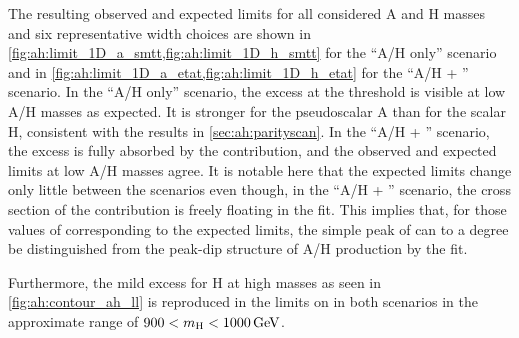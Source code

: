 The resulting observed and expected limits for all considered A and H masses and six representative width choices are shown in \cref{fig:ah:limit_1D_a_smtt,fig:ah:limit_1D_h_smtt} for the ``A/H only'' scenario and in \cref{fig:ah:limit_1D_a_etat,fig:ah:limit_1D_h_etat} for the ``A/H + \etat'' scenario. In the ``A/H only'' scenario, the excess at the \ttbar threshold is visible at low A/H masses as expected. It is stronger for the pseudoscalar A than for the scalar H, consistent with the results in \cref{sec:ah:parityscan}. In the ``A/H + \etat'' scenario, the excess is fully absorbed by the \etat contribution, and the observed and expected limits at low A/H masses agree. It is notable here that the expected limits change only little between the scenarios even though, in the ``A/H + \etat'' scenario, the cross section of the \etat contribution is freely floating in the fit. 
This implies that, for those values of \gAHtt corresponding to the expected limits, the simple peak of \etat can to a degree be distinguished from the peak-dip structure of A/H production by the fit.

Furthermore, the mild excess for H at high masses as seen in \cref{fig:ah:contour_ah_ll} is reproduced in the limits on \gHtt in both scenarios in the approximate range of $900 < \mH < \SI{1000}{\GeV}$.

